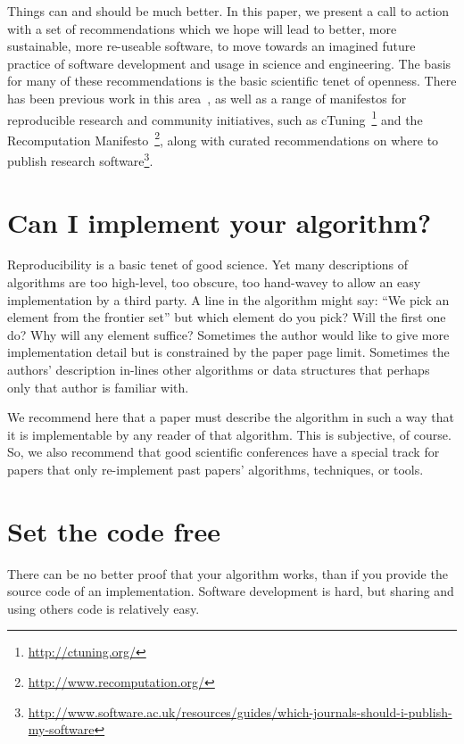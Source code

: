 \documentclass[10pt,conference,final]{IEEEtran}
\begin{document}
Things can and should be much better. In this paper, we present a call
to action with a set of recommendations which we hope will lead to
better, more sustainable, more re-useable software, to move towards an
imagined future practice of software development and usage in science
and engineering.  The basis for many of these recommendations is the
basic scientific tenet of openness. There has been previous work in
this area~\cite{sim-et-al:2003,chirigati-et-al:2013}, as well as a
range of manifestos for reproducible research and community
initiatives, such as cTuning~\cite{fursin-et-al:2014}\footnote{\url{http://ctuning.org/}} and
the Recomputation
Manifesto~\cite{gent:2013}\footnote{\url{http://www.recomputation.org/}},
along with curated recommendations on where to publish research
software\footnote{\url{http://www.software.ac.uk/resources/guides/which-journals-should-i-publish-my-software}}.

\section{Can I implement your algorithm?}

Reproducibility is a basic tenet of good science. Yet many
descriptions of algorithms are too high-level, too obscure, too
hand-wavey to allow an easy implementation by a third party. A line in
the algorithm might say: ``We pick an element from the frontier set''
but which element do you pick? Will the first one do? Why will any
element suffice? Sometimes the author would like to give more
implementation detail but is constrained by the paper page
limit. Sometimes the authors' description in-lines other algorithms or
data structures that perhaps only that author is familiar with.

We recommend here that a paper must describe the algorithm in such a
way that it is implementable by any reader of that algorithm. This is
subjective, of course. So, we also recommend that good scientific
conferences have a special track for papers that only re-implement
past papers' algorithms, techniques, or tools.


\section{Set the code free} 

There can be no better proof that your algorithm works, than if you
provide the source code of an implementation. Software development is
hard, but sharing and using others code is relatively easy.
\end{document}
